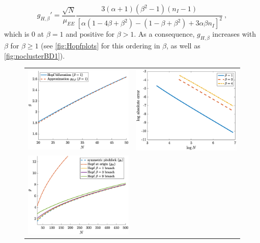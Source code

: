 \documentclass[reqno]{siamonline190516}
\begin{document}
\begin{equation}\label{eq:gprime}
g_{H,\beta}' = \frac{ \sqrt{N} }{ \mu_{EE} }
    \frac{ 
    3(\alpha+1)(\beta^2-1)(n_I-1)
    }
    { 
        \left[ \alpha(1 - 4 \beta + \beta^2) - (1 - \beta + \beta^2) + 3 \alpha \beta n_I \right]^2
    }\:,
\end{equation}
which is 0 at $\beta = 1$ and positive for $\beta > 1$. As a consequence, $g_{H,\beta}$ increases with $\beta$ for $\beta \geq 1$ (see \cref{fig:Hopfplots} for this ordering in $\beta$, as well as \cref{fig:noclusterBD1}). 

\begin{figure}
    \centering
    \begin{tabular}{cc}
    \includegraphics[width=7.8cm]{images/Hopfapproxbeta1.eps} &
    \includegraphics[width=7.8cm]{images/Hopfapproxerror.eps} \\
    \includegraphics[width=7.8cm]{images/HopfNvsg.eps} &

\end{tabular}
\end{figure}
\end{document}
